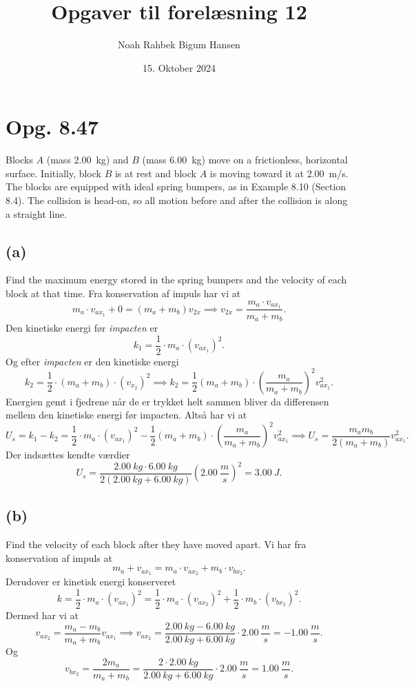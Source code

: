 \documentclass[12pt]{article}
\title{Opgaver til forelæsning 12}
\author{Noah Rahbek Bigum Hansen}
\date{15. Oktober 2024}
\begin{document}
\maketitle

\section*{Opg. 8.47}
Blocks $A$ (mass \qty{2,00}{kg}) and $B$ (mass \qty{6,00}{kg}) move on a frictionless, horizontal surface. Initially, block $B$ is at rest and block $A$ is moving toward it at \qty{2,00}{m/s}. The blocks are equipped with ideal spring bumpers, as in Example 8.10 (Section 8.4). The collision is head-on, so all motion before and after the collision is along a straight line.

\subsection*{(a)}
Find the maximum energy stored in the spring bumpers and the velocity of each block at that time.
\bigbreak
Fra konservation af impuls har vi at
\[
m_a\cdot v_{ax_1} + 0 = (m_a + m_b)v_{2x} \implies v_{2x} = \frac{m_a\cdot v_{ax_1}}{m_a+m_b}
.\] 
Den kinetiske energi før \textit{impacten} er
\[
k_1 = \frac{1}{2} \cdot m_a \cdot \left( v_{ax_1} \right)^2  
.\] 
Og efter \textit{impacten} er den kinetiske energi
\[
k_2 = \frac{1}{2} \cdot (m_a + m_b) \cdot \left( v_{x_2} \right)^2  \implies k_2 = \frac{1}{2}(m_a + m_b) \cdot \left( \frac{m_a}{m_a + m_b} \right)^2 v_{ax_{1}}^2
.\]
Energien gemt i fjedrene når de er trykket helt sammen bliver da differensen mellem den kinetiske energi før impacten. Altså har vi at
\[
U_s = k_1 - k_2 = \frac{1}{2} \cdot m_a \cdot \left( v_{ax_1} \right)^2 - \frac{1}{2}(m_a + m_b) \cdot \left( \frac{m_a}{m_a+m_b} \right) ^2 v_{ax_1}^2 \implies U_s = \frac{m_a m_b}{2(m_a + m_b)}v_{ax_1}^2 
.\]
Der indsættes kendte værdier
\[
U_s = \frac{\qty{2,00}{kg}\cdot \qty{6,00}{kg}}{2\left( \qty{2,00}{kg} + \qty{6,00}{kg} \right)} \left( \qty{2,00}{\frac{m}{s}} \right)^2 = \qty{3,00}{J}
.\] 

\subsection*{(b)}
Find the velocity of each block after they have moved apart.
\bigbreak
Vi har fra konservation af impuls at
\[
m_a + v_{ax_1} = m_a \cdot  v_{ax_2} + m_b \cdot v_{bx_2} 
.\] 
Derudover er kinetisk energi konserveret
\[
k = \frac{1}{2} \cdot m_a \cdot \left( v_{ax_1} \right)^2 = \frac{1}{2} \cdot m_a \cdot \left( v_{ax_2} \right)^2 + \frac{1}{2} \cdot m_b \cdot \left( v_{bx_2} \right)^2  
.\]
Dermed har vi at
\[
v_{ax_2} = \frac{m_a-m_b}{m_a + m_b}v_{ax_1} \implies v_{ax_2} = \frac{\qty{2,00}{kg} - \qty{6,00}{kg}}{\qty{2,00}{kg} + \qty{6,00}{kg}} \cdot \qty{2,00}{\frac{m}{s}} = \qty{-1,00}{\frac{m}{s}}
.\]
Og
\[
v_{bx_2} = \frac{2m_a}{m_a+m_b} = \frac{2\cdot \qty{2,00}{kg}}{\qty{2,00}{kg} + \qty{6,00}{kg}}\cdot \qty{2,00}{\frac{m}{s}} = \qty{1,00}{\frac{m}{s}}
.\] 
\end{document}

